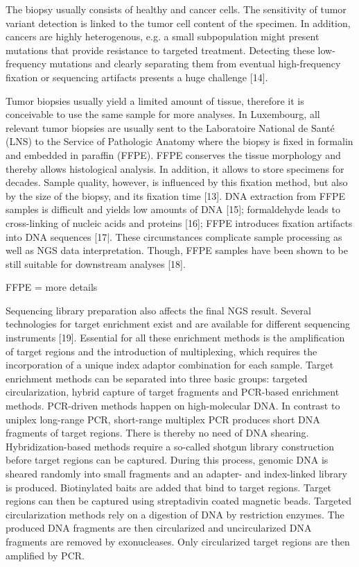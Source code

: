 The biopsy usually consists of healthy and cancer cells. The sensitivity of
tumor variant detection is linked to the tumor cell content of the specimen. In
addition, cancers are highly heterogenous, e.g. a small subpopulation might
present mutations that provide resistance to targeted treatment. Detecting these
low-frequency mutations and clearly separating them from eventual high-frequency
fixation or sequencing artifacts presents a huge challenge [14].

Tumor biopsies usually yield a limited amount of tissue, therefore it is
conceivable to use the same sample for more analyses. In Luxembourg, all
relevant tumor biopsies are usually sent to the Laboratoire National de Santé
(LNS) to the Service of Pathologic Anatomy where the biopsy is fixed in formalin
and embedded in paraffin (FFPE). FFPE conserves the tissue morphology and
thereby allows histological analysis. In addition, it allows to store specimens
for decades. Sample quality, however, is influenced by this fixation method, but
also by the size of the biopsy, and its fixation time [13]. DNA extraction from
FFPE samples is difficult and yields low amounts of DNA [15]; formaldehyde leads
to cross-linking of nucleic acids and proteins [16]; FFPE introduces fixation
artifacts into DNA sequences [17|. These circumstances complicate sample
processing as well as NGS data interpretation. Though, FFPE samples have been
shown to be still suitable for downstream analyses [18].

FFPE = more details

Sequencing library preparation also affects the final NGS result. Several
technologies for target enrichment exist and are available for different
sequencing instruments [19]. Essential for all these enrichment methods is the
amplification of target regions and the introduction of multiplexing, which
requires the incorporation of a unique index adaptor combination for each
sample. Target enrichment methods can be separated into three basic groups:
targeted circularization, hybrid capture of target fragments and PCR-based
enrichment methods. PCR-driven methods happen on high-molecular DNA. In contrast
to uniplex long-range PCR, short-range multiplex PCR produces short DNA
fragments of target regions. There is thereby no need of DNA shearing.
Hybridization-based methods require a so-called shotgun library construction
before target regions can be captured. During this process, genomic DNA is
sheared randomly into small fragments and an adapter- and index-linked library
is produced. Biotinylated baits are added that bind to target regions. Target
regions can then be captured using streptadivin coated magnetic beads. Targeted
circularization methods rely on a digestion of DNA by restriction enzymes. The
produced DNA fragments are then circularized and uncircularized DNA fragments
are removed by exonucleases. Only circularized target regions are then amplified
by PCR.

